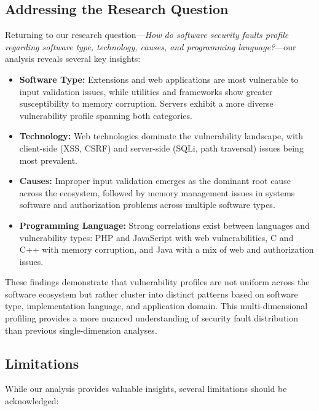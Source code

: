 \subsection{Addressing the Research Question}

Returning to our research question—\textit{How do software security faults profile regarding software type, technology, causes, and programming language?}—our analysis reveals several key insights:

\begin{itemize}
    \item \textbf{Software Type:} Extensions and web applications are most vulnerable to input validation issues, while utilities and frameworks show greater susceptibility to memory corruption. Servers exhibit a more diverse vulnerability profile spanning both categories.
    
    \item \textbf{Technology:} Web technologies dominate the vulnerability landscape, with client-side (XSS, CSRF) and server-side (SQLi, path traversal) issues being most prevalent.
    
    \item \textbf{Causes:} Improper input validation emerges as the dominant root cause across the ecosystem, followed by memory management issues in systems software and authorization problems across multiple software types.
    
    \item \textbf{Programming Language:} Strong correlations exist between languages and vulnerability types: PHP and JavaScript with web vulnerabilities, C and C++ with memory corruption, and Java with a mix of web and authorization issues.
\end{itemize}

These findings demonstrate that vulnerability profiles are not uniform across the software ecosystem but rather cluster into distinct patterns based on software type, implementation language, and application domain. This multi-dimensional profiling provides a more nuanced understanding of security fault distribution than previous single-dimension analyses.

\subsection{Limitations}

While our analysis provides valuable insights, several limitations should be acknowledged:

